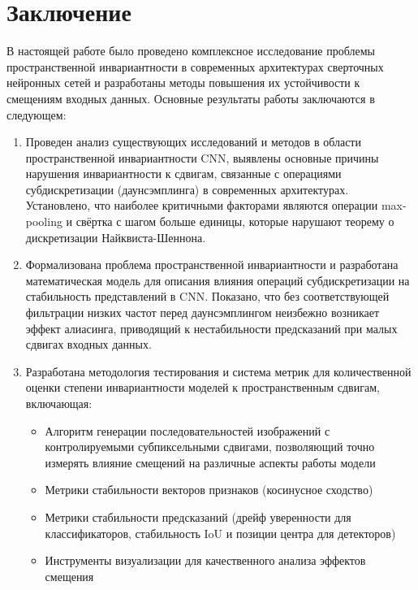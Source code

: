 \chapter*{Заключение}

В настоящей работе было проведено комплексное исследование проблемы пространственной инвариантности в современных архитектурах сверточных нейронных сетей и разработаны методы повышения их устойчивости к смещениям входных данных. Основные результаты работы заключаются в следующем:

\begin{enumerate}
    \item Проведен анализ существующих исследований и методов в области пространственной инвариантности CNN, выявлены основные причины нарушения инвариантности к сдвигам, связанные с операциями субдискретизации (даунсэмплинга) в современных архитектурах. Установлено, что наиболее критичными факторами являются операции max-pooling и свёртка с шагом больше единицы, которые нарушают теорему о дискретизации Найквиста-Шеннона.
    
    \item Формализована проблема пространственной инвариантности и разработана математическая модель для описания влияния операций субдискретизации на стабильность представлений в CNN. Показано, что без соответствующей фильтрации низких частот перед даунсэмплингом неизбежно возникает эффект алиасинга, приводящий к нестабильности предсказаний при малых сдвигах входных данных.
    
    \item Разработана методология тестирования и система метрик для количественной оценки степени инвариантности моделей к пространственным сдвигам, включающая:
    \begin{itemize}
        \item Алгоритм генерации последовательностей изображений с контролируемыми субпиксельными сдвигами, позволяющий точно измерять влияние смещений на различные аспекты работы модели
        \item Метрики стабильности векторов признаков (косинусное сходство)
        \item Метрики стабильности предсказаний (дрейф уверенности для классификаторов, стабильность IoU и позиции центра для детекторов)
        \item Инструменты визуализации для качественного анализа эффектов смещения
    \end{itemize}
    

\end{enumerate}
